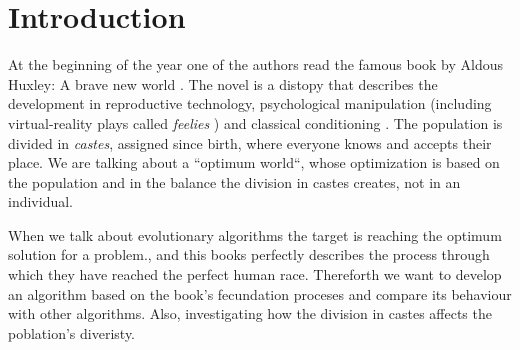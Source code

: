 \section{Introduction}


At the beginning of the year one of the authors read the famous book by Aldous Huxley: A brave new world  \cite{huxley2007brave}. The novel
is a distopy that describes the development in reproductive technology, psychological manipulation (including virtual-reality plays called {\em feelies} \cite{lecakes2021matrix})  and classical conditioning \cite{bernheim2002addiction}.
The population is divided in \textit{castes}, assigned since birth, where everyone knows and accepts their place. We are
talking about a ``optimum world``, whose optimization is based on the population and in the balance the division in 
castes creates, not in an individual.

When we talk about evolutionary algorithms the target is reaching the optimum solution for a problem., and this books
perfectly describes the process through which they have reached the perfect human race. Thereforth we want to develop
an algorithm based on the book's fecundation proceses and compare its behaviour with other algorithms. Also, investigating
how the division in castes affects the poblation's diveristy.



